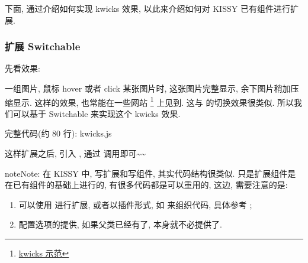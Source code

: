\documentclass[letterpaper,10pt,english]{sphinxmanual}
\begin{document}
下面, 通过介绍如何实现 kwicks 效果, 以此来介绍如何对 KISSY 已有组件进行扩展.


\subsubsection{扩展 Switchable}
\label{quickstart/extendwidgets:switchable}
先看效果:

一组图片, 鼠标 hover 或者 click 某张图片时, 这张图片完整显示, 余下图片稍加压缩显示. 这样的效果, 也常能在一些网站 \footnote{
\href{http://eyedraw.eu/}{kwicks 示范}
} 上见到. 这与 {\hyperref[api/component/switchable/switchable:module-Switchable]{}} 的切换效果很类似. 所以我们可以基于 Switchable 来实现这个 kwicks 效果.

完整代码(约 80 行): kwicks.js

这样扩展之后, 引入  , 通过  调用即可\textasciitilde{}\textasciitilde{}

\begin{notice}{note}{Note:}
在 KISSY 中, 写扩展和写组件, 其实代码结构很类似. 只是扩展组件是在已有组件的基础上进行的, 有很多代码都是可以重用的, 这边, 需要注意的是:
\begin{enumerate}
\item {}
可以使用  {\hyperref[api/seed/kissy/extend:Seed.KISSY.extend]{}}  进行扩展, 或者以插件形式, 如  来组织代码, 具体参考 ;

\item {}
配置选项的提供, 如果父类已经有了, 本身就不必提供了.

\end{enumerate}
\end{notice}
\end{document}
